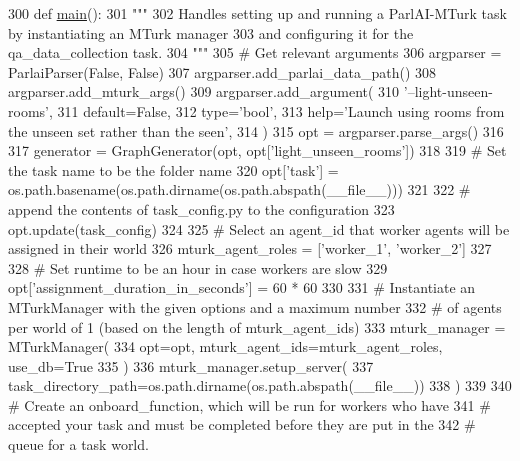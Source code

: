 \begin{DoxyCode}
300 \textcolor{keyword}{def }\hyperlink{namespaceprojects_1_1wizard__of__wikipedia_1_1mturk__evaluation__task_1_1run_ad3ab2c71f8083c3112815c0b363d316b}{main}():
301     \textcolor{stringliteral}{"""}
302 \textcolor{stringliteral}{    Handles setting up and running a ParlAI-MTurk task by instantiating an MTurk manager}
303 \textcolor{stringliteral}{    and configuring it for the qa\_data\_collection task.}
304 \textcolor{stringliteral}{    """}
305     \textcolor{comment}{# Get relevant arguments}
306     argparser = ParlaiParser(\textcolor{keyword}{False}, \textcolor{keyword}{False})
307     argparser.add\_parlai\_data\_path()
308     argparser.add\_mturk\_args()
309     argparser.add\_argument(
310         \textcolor{stringliteral}{'--light-unseen-rooms'},
311         default=\textcolor{keyword}{False},
312         type=\textcolor{stringliteral}{'bool'},
313         help=\textcolor{stringliteral}{'Launch using rooms from the unseen set rather than the seen'},
314     )
315     opt = argparser.parse\_args()
316 
317     generator = GraphGenerator(opt, opt[\textcolor{stringliteral}{'light\_unseen\_rooms'}])
318 
319     \textcolor{comment}{# Set the task name to be the folder name}
320     opt[\textcolor{stringliteral}{'task'}] = os.path.basename(os.path.dirname(os.path.abspath(\_\_file\_\_)))
321 
322     \textcolor{comment}{# append the contents of task\_config.py to the configuration}
323     opt.update(task\_config)
324 
325     \textcolor{comment}{# Select an agent\_id that worker agents will be assigned in their world}
326     mturk\_agent\_roles = [\textcolor{stringliteral}{'worker\_1'}, \textcolor{stringliteral}{'worker\_2'}]
327 
328     \textcolor{comment}{# Set runtime to be an hour in case workers are slow}
329     opt[\textcolor{stringliteral}{'assignment\_duration\_in\_seconds'}] = 60 * 60
330 
331     \textcolor{comment}{# Instantiate an MTurkManager with the given options and a maximum number}
332     \textcolor{comment}{# of agents per world of 1 (based on the length of mturk\_agent\_ids)}
333     mturk\_manager = MTurkManager(
334         opt=opt, mturk\_agent\_ids=mturk\_agent\_roles, use\_db=\textcolor{keyword}{True}
335     )
336     mturk\_manager.setup\_server(
337         task\_directory\_path=os.path.dirname(os.path.abspath(\_\_file\_\_))
338     )
339 
340     \textcolor{comment}{# Create an onboard\_function, which will be run for workers who have}
341     \textcolor{comment}{# accepted your task and must be completed before they are put in the}
342     \textcolor{comment}{# queue for a task world.}

\end{DoxyCode}
